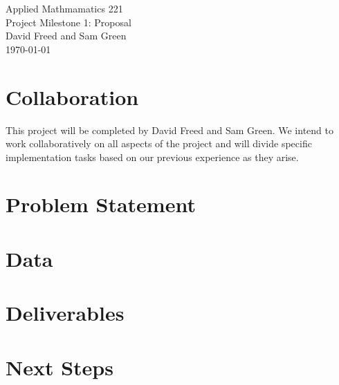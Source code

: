 \documentclass[12pt]{article}
\begin{document}
\begin{center}
{\Large Applied Mathmamatics 221}\\
Project Milestone 1: Proposal\\
David Freed and Sam Green\\
\today
\end{center}

\section{Collaboration}

This project will be completed by David Freed and Sam Green. We intend to work collaboratively on all aspects of the project and will divide specific implementation tasks based on our previous experience as they arise.

\section{Problem Statement}



\section{Data}

\section{Deliverables}

\section{Next Steps}
\end{document}
